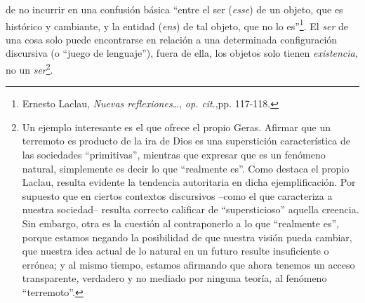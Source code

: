 de no incurrir en una confusión básica \enquote{entre el ser (\emph{esse}) de un
objeto, que es histórico y cambiante, y la entidad (\emph{ens}) de tal
objeto, que no lo es}\footnote{Ernesto Laclau, \emph{Nuevas
  reflexiones\ldots{}}, \emph{op. cit}.,pp. 117-118.}. El \emph{ser} de
una cosa solo puede encontrarse en relación a una determinada
configuración discursiva (o ``juego de lenguaje''), fuera de ella, los
objetos solo tienen \emph{existencia}, no un \emph{ser}\footnote{Un
  ejemplo interesante es el que ofrece el propio Geras. Afirmar que un
  terremoto es producto de la ira de Dios es una superstición
  característica de las sociedades \enquote{primitivas}, mientras que expresar
  que es un fenómeno natural, simplemente es decir lo que \enquote{realmente
  es}. Como destaca el propio Laclau, resulta evidente la tendencia
  autoritaria en dicha ejemplificación. Por supuesto que en ciertos
  contextos discursivos --como el que caracteriza a nuestra sociedad--
  resulta correcto calificar de \enquote{supersticioso} aquella creencia. Sin
  embargo, otra es la cuestión al contraponerlo a lo que \enquote{realmente es},
  porque estamos negando la posibilidad de que nuestra visión pueda
  cambiar, que nuestra idea actual de lo natural en un futuro resulte
  insuficiente o errónea; y al mismo tiempo, estamos afirmando que ahora
  tenemos un acceso transparente, verdadero y no mediado por ninguna
  teoría, al fenómeno \enquote{terremoto}.}.

